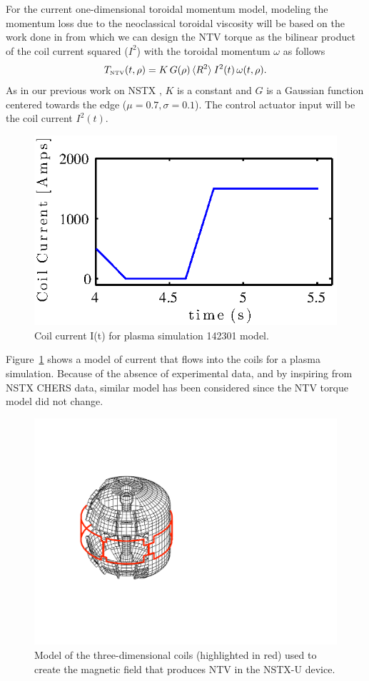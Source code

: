 \documentclass[12pt,lot, lof]{puthesis}
\begin{document}
For the current one-dimensional toroidal momentum model, modeling the momentum loss due to the neoclassical toroidal viscosity will be based on the work done in \cite{Zhu06} from which we can design the NTV torque as the bilinear product of the coil current squared ($I^2$) with the toroidal momentum $\omega$ as follows
\begin{equation}
T_\textrm{\tiny NTV}  (t, \rho) =   K \, G(\rho) \,  \langle R^2 \rangle \:  I^2(t) \,\omega (t, \rho) .
\label{eq:sys_recall}
\end{equation}
As in our previous work on NSTX \cite{Goumiri15}, $K$ is a constant and $G$ is a Gaussian function centered towards the edge ($\mu =0.7, \sigma =0.1$). The control actuator input will be the coil current $I^2(t)$.
\begin{figure} 
\centering
\includegraphics [width=0.8 \linewidth]{chap10/fig7} 
\caption{Coil current I(t) for plasma simulation 142301 model.}
\label{NTV1}
\end{figure}

Figure~{\ref{NTV1}} shows a model of current that flows into the coils for a plasma simulation. Because of the absence of experimental data, and by inspiring from NSTX CHERS data, similar model has been considered since the NTV torque model did not change.  
\begin{figure} 
\centering
\includegraphics [width=0.6 \linewidth]{chap10/NTVdevice} 
\caption{Model of the three-dimensional coils (highlighted in
  red) used to create the magnetic field that produces NTV in the NSTX-U device.}
\label{NTV2}
\end{figure}
%
\end{document}
